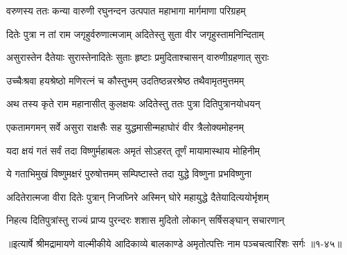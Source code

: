 \twolineshloka
{वरुणस्य ततः कन्या वारुणी रघुनन्दन}
{उत्पपात महाभागा मार्गमाणा परिग्रहम्} %

\twolineshloka
{दितेः पुत्रा न तां राम जगृहुर्वरुणात्मजाम्}
{अदितेस्तु सुता वीर जगृहुस्तामनिन्दिताम्} %

\twolineshloka
{असुरास्तेन दैतेयाः सुरास्तेनादितेः सुताः}
{हृष्टाः प्रमुदिताश्चासन् वारुणीग्रहणात् सुराः} %

\twolineshloka
{उच्चैःश्रवा हयश्रेष्ठो मणिरत्नं च कौस्तुभम्}
{उदतिष्ठन्नरश्रेष्ठ तथैवामृतमुत्तमम्} %

\twolineshloka
{अथ तस्य कृते राम महानासीत् कुलक्षयः}
{अदितेस्तु ततः पुत्रा दितिपुत्रानयोधयन्} %

\twolineshloka
{एकतामगमन् सर्वे असुरा राक्षसैः सह}
{युद्धमासीन्महाघोरं वीर त्रैलोक्यमोहनम्} %

\twolineshloka
{यदा क्षयं गतं सर्वं तदा विष्णुर्महाबलः}
{अमृतं सोऽहरत् तूर्णं मायामास्थाय मोहिनीम्} %

\twolineshloka
{ये गताभिमुखं विष्णुमक्षरं पुरुषोत्तमम्}
{सम्पिष्टास्ते तदा युद्धे विष्णुना प्रभविष्णुना} %

\twolineshloka
{अदितेरात्मजा वीरा दितेः पुत्रान् निजघ्निरे}
{अस्मिन् घोरे महायुद्धे दैतेयादित्ययोर्भृशम्} %

\twolineshloka
{निहत्य दितिपुत्रांस्तु राज्यं प्राप्य पुरन्दरः}
{शशास मुदितो लोकान् सर्षिसङ्घान् सचारणान्} %


॥इत्यार्षे श्रीमद्रामायणे वाल्मीकीये आदिकाव्ये बालकाण्डे अमृतोत्पत्तिः नाम पञ्चचत्वारिंशः सर्गः ॥१-४५॥

